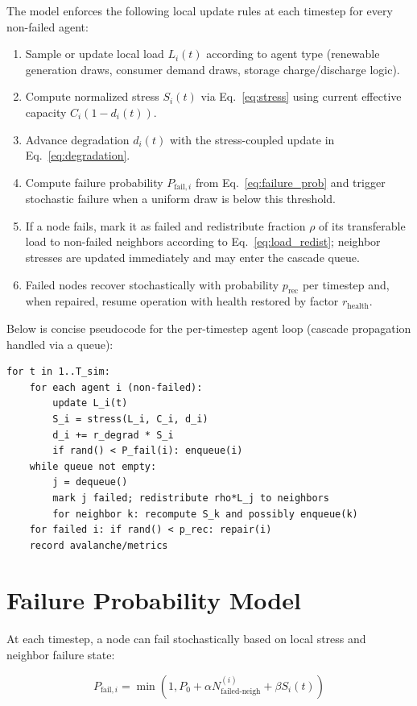 \documentclass[12pt,a4paper,twoside]{report}
\begin{document}
The model enforces the following local update rules at each timestep for every non-failed agent:
\begin{enumerate}
\item Sample or update local load $L_i(t)$ according to agent type (renewable generation draws, consumer demand draws, storage charge/discharge logic).
\item Compute normalized stress $S_i(t)$ via Eq.~\eqref{eq:stress} using current effective capacity $C_i(1-d_i(t))$.
\item Advance degradation $d_i(t)$ with the stress-coupled update in Eq.~\eqref{eq:degradation}.
\item Compute failure probability $P_{\text{fail},i}$ from Eq.~\eqref{eq:failure_prob} and trigger stochastic failure when a uniform draw is below this threshold.
\item If a node fails, mark it as failed and redistribute fraction $\rho$ of its transferable load to non-failed neighbors according to Eq.~\eqref{eq:load_redist}; neighbor stresses are updated immediately and may enter the cascade queue.
\item Failed nodes recover stochastically with probability $p_{\text{rec}}$ per timestep and, when repaired, resume operation with health restored by factor $r_{\text{health}}$.
\end{enumerate}

Below is concise pseudocode for the per-timestep agent loop (cascade propagation handled via a queue):
\begin{verbatim}
for t in 1..T_sim:
	for each agent i (non-failed):
		update L_i(t)
		S_i = stress(L_i, C_i, d_i)
		d_i += r_degrad * S_i
		if rand() < P_fail(i): enqueue(i)
	while queue not empty:
		j = dequeue()
		mark j failed; redistribute rho*L_j to neighbors
		for neighbor k: recompute S_k and possibly enqueue(k)
	for failed i: if rand() < p_rec: repair(i)
	record avalanche/metrics
\end{verbatim}


\section{Failure Probability Model}

At each timestep, a node can fail stochastically based on local stress and neighbor failure state:

\begin{equation}
P_{\text{fail}, i} = \min\left(1, P_0 + \alpha N_{\text{failed-neigh}}^{(i)} + \beta S_i(t)\right)
\label{eq:failure_prob}
\end{equation}
\end{document}
